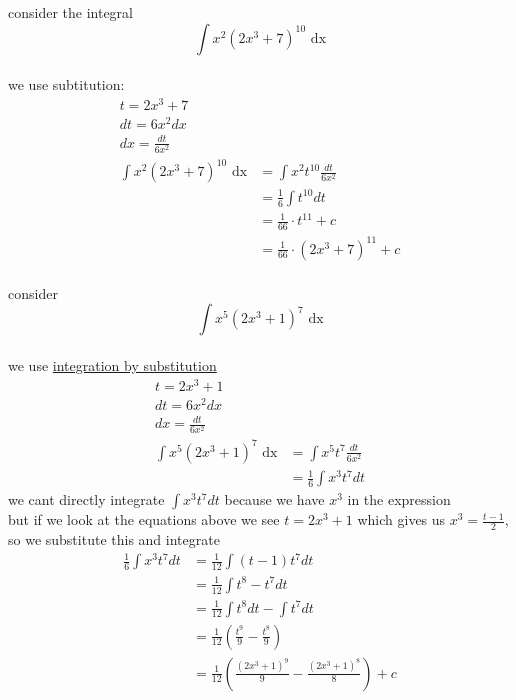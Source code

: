 \documentclass[a4paper,12pt]{article}
\newcommand{\?}{\stackrel{?}{=}}
\begin{document}
\begin{definition}
\begin{my_example}
consider the integral\\[0pt]
\[
  \int x^2{(2x^3 + 7)}^{10} \text{ dx}
\]\\[0pt]
we use subtitution:\\[0pt]
\begin{align*}
  t = 2x^3 + 7\\
  dt = 6x^2 dx\\
  dx = \frac{dt}{6x^2}\\
  \int x^2{(2x^3 + 7)}^{10} \text{ dx} &= \int x^2t^{10} \frac{dt}{6x^2}\\
  &= \frac16 \int t^{10} dt\\
  &= \frac{1}{66} \cdot t^{11} + c\\
  &= \frac{1}{66} \cdot {(2x^3 + 7)}^{11} + c\\
\end{align*}
\end{my_example}

\begin{my_example}
consider\\[0pt]
\[ \int x^5(2x^3 + 1)^7 \text{ dx} \]\\[0pt]
we use \hyperref[sec:orgf2294be]{integration by substitution}\\[0pt]
\begin{align*}
  t = 2x^3 + 1\\
  dt = 6x^2 dx\\
  dx = \frac{dt}{6x^2}\\
  \int x^5(2x^3 + 1)^7 \text{ dx} &= \int x^5t^7 \frac{dt}{6x^2}\\
  &= \frac16 \int x^3t^7 dt
\end{align*}
we cant directly integrate \(\int x^3t^7 dt\) because we have \(x^3\) in the expression\\[0pt]
but if we look at the equations above we see \(t = 2x^3 + 1\) which gives us \(x^3 = \frac{t-1}{2}\), so we substitute this and integrate\\[0pt]
\begin{align*}
  \frac16 \int x^3t^7 dt &= \frac{1}{12} \int (t-1)t^7 dt\\
  &= \frac{1}{12} \int t^8-t^7 dt\\
  &= \frac{1}{12} \int t^8 dt - \int t^7 dt\\
  &= \frac{1}{12} \left(\frac{t^9}{9} - \frac{t^8}{9}\right)\\
  &= \frac{1}{12} \left(\frac{{(2x^3 + 1)}^9}{9} - \frac{{(2x^3 + 1)}^8}{8}\right) + c\\
\end{align*}
\end{my_example}


\end{definition}
\end{document}
